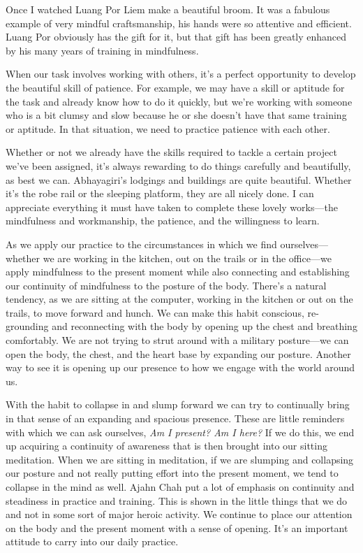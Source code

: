 Once I watched Luang Por Liem make a beautiful broom. It was a fabulous 
example of very mindful craftsmanship, his hands were so attentive and 
efficient. Luang Por obviously has the gift for it, but that gift has 
been greatly enhanced by his many years of training in mindfulness.

When our task involves working with others, it's a perfect opportunity 
to develop the beautiful skill of patience. For example, we may have a 
skill or aptitude for the task and already know how to do it quickly, 
but we're working with someone who is a bit clumsy and slow because he 
or she doesn't have that same training or aptitude. In that situation, 
we need to practice patience with each other.

Whether or not we already have the skills required to tackle a certain 
project we've been assigned, it's always rewarding to do things 
carefully and beautifully, as best we can. Abhayagiri's lodgings and 
buildings are quite beautiful. Whether it's the robe rail or the 
sleeping platform, they are all nicely done. I can appreciate 
everything it must have taken to complete these lovely works---the 
mindfulness and workmanship, the patience, and the willingness to learn.


As we apply our practice to the circumstances in which we find 
ourselves---whether we are working in the kitchen, out on the trails or 
in the office---we apply mindfulness to the present moment while also 
connecting and establishing our continuity of mindfulness to the 
posture of the body. There's a natural tendency, as we are sitting at 
the computer, working in the kitchen or out on the trails, to move 
forward and hunch. We can make this habit conscious, re-grounding and 
reconnecting with the body by opening up the chest and breathing 
comfortably. We are not trying to strut around with a military 
posture---we can open the body, the chest, and the heart base by 
expanding our posture. Another way to see it is opening up our presence 
to how we engage with the world around us.

With the habit to collapse in and slump forward we can try to 
continually bring in that sense of an expanding and spacious presence. 
These are little reminders with which we can ask ourselves, \emph{Am I 
present? Am I here?} If we do this, we end up acquiring a continuity of 
awareness that is then brought into our sitting meditation. When we are 
sitting in meditation, if we are slumping and collapsing our posture 
and not really putting effort into the present moment, we tend to 
collapse in the mind as well. Ajahn Chah put a lot of emphasis on 
continuity and steadiness in practice and training. This is shown in 
the little things that we do and not in some sort of major heroic 
activity. We continue to place our attention on the body and the 
present moment with a sense of opening. It's an important attitude to 
carry into our daily practice.

